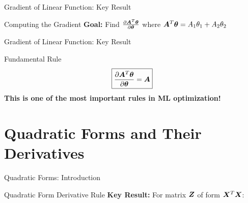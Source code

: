\documentclass[handout]{beamer}
\begin{document}
\begin{frame}{Gradient of Linear Function: Key Result}
\begin{keypointsbox}{Computing the Gradient}
\textbf{Goal:} Find $\frac{\partial \bm{A}^T\bm{\theta}}{\partial \bm{\theta}}$ where $\bm{A}^T\bm{\theta} = A_{1}\theta_{1} + A_{2}\theta_{2}$
\end{keypointsbox}

\end{frame}

\begin{frame}{Gradient of Linear Function: Key Result}
\begin{alertbox}{Fundamental Rule}
$$\boxed{\frac{\partial \bm{A}^T\bm{\theta}}{\partial \bm{\theta}} = \bm{A}}$$
\textbf{This is one of the most important rules in ML optimization!}
\end{alertbox}
\end{frame}


\section{Quadratic Forms and Their Derivatives}

\begin{frame}{Quadratic Forms: Introduction}
\begin{definitionbox}{Quadratic Form Derivative Rule}
\textbf{Key Result:} For matrix $\bm{Z}$ of form $\bm{X}^T\bm{X}$:
\end{definitionbox}

\end{frame}
\end{document}
